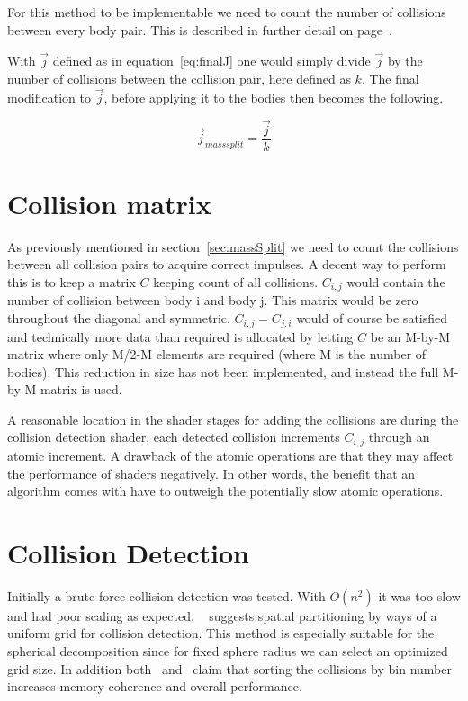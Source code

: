 For this method to be implementable we need to count the number of collisions between
every body pair. This is described in further detail on page~\pageref{sec:colMatrix}.

With $\vec{j}$ defined as in equation~\ref{eq:finalJ} one would simply divide $\vec{j}$ by
the number of collisions between the collision pair, here defined as $k$. The final modification to
$\vec{j}$, before applying it to the bodies then becomes the following.

\begin{equation}
  \vec{j}_{mass split} = \frac{\vec{j}}{k}
\end{equation}

\section{Collision matrix}\label{sec:colMatrix}
As previously mentioned in section~\ref{sec:massSplit} we need to count the collisions
between all collision pairs to acquire correct impulses. A decent way to perform
this is to keep a matrix $C$ keeping count of all collisions. $C_{i,j}$ would
contain the number of collision between body i and body j. This matrix would be
zero throughout the diagonal and symmetric. $C_{i,j} = C_{j,i}$ would of course
be satisfied and technically more data than required is allocated by letting $C$
be an M-by-M matrix where only M/2-M elements are required (where M is the
number of bodies). This reduction in size
has not been implemented, and instead the full M-by-M matrix is used.

A reasonable location in the shader stages for adding the collisions are during
the collision detection shader, each detected collision increments $C_{i,j}$
 through an atomic increment. A drawback of the atomic
 operations are that they may affect the performance of shaders negatively. In
 other words, the benefit that an algorithm comes with have to outweigh the potentially
 slow atomic operations.

\section{Collision Detection}
Initially a brute force collision detection was tested. With $O(n^2)$ it was too
slow and had poor scaling as expected. ~\cite{gpugems} suggests spatial partitioning
by ways of a uniform grid for collision detection. This method is especially suitable
for the spherical decomposition since for fixed sphere radius we can select an optimized
grid size. In addition both~\cite{gpugems} and~\cite{fastnearest} claim that sorting
the collisions by bin number increases memory coherence and overall performance.

